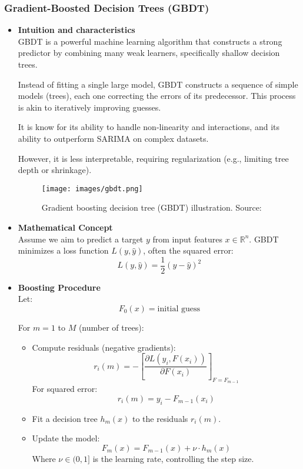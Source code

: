 \medskip
\subsubsection*{Gradient-Boosted Decision Trees (GBDT)}
\begin{itemize}
    \item \textbf{Intuition and characteristics} \\
    GBDT is a powerful machine learning algorithm that constructs a strong predictor by combining many 
    weak learners, specifically shallow decision trees.

    Instead of fitting a single large model, GBDT constructs a sequence of simple models (trees), 
    each one correcting the errors of its predecessor. This process is akin to iteratively improving 
    guesses.

    It is know for its ability to handle non-linearity and interactions, and its ability to 
    outperform SARIMA on complex datasets.
    
    However, it is less interpretable, requiring regularization (e.g., limiting tree depth or shrinkage).
    
    \begin{figure}[h!]
    \centering
    \texttt{[image: images/gbdt.png]}
    \caption{Gradient boosting decision tree (GBDT) illustration. Source: \cite{SaniAbba2022}}
    \label{fig:gbdt-illustration}
    \end{figure}

    \item \textbf{Mathematical Concept} \\
    Assume we aim to predict a target $y$ from input features $x \in \mathbb{R}^n$. GBDT minimizes a loss function $L(y, \hat{y})$, often the squared error:
    \[
    L(y, \hat{y}) = \frac{1}{2}(y - \hat{y})^2
    \]
    \item \textbf{Boosting Procedure} \\
    Let:
    \[
    F_0(x) = \text{initial guess}
    \]

    For $m = 1$ to $M$ (number of trees):

    \begin{itemize}
        \item Compute residuals (negative gradients):
        \[
        r_i(m) = -\left[\frac{\partial L(y_i, F(x_i))}{\partial F(x_i)}\right]_{F=F_{m-1}}
        \]
        For squared error: 
        \[
        r_i(m) = y_i - F_{m-1}(x_i)
        \]
        \item Fit a decision tree $h_m(x)$ to the residuals $r_i(m)$.
        \item Update the model:
        \[
        F_m(x) = F_{m-1}(x) + \nu \cdot h_m(x)
        \]
        Where $\nu \in (0, 1]$ is the learning rate, controlling the step size.
    \end{itemize}


\end{itemize}
